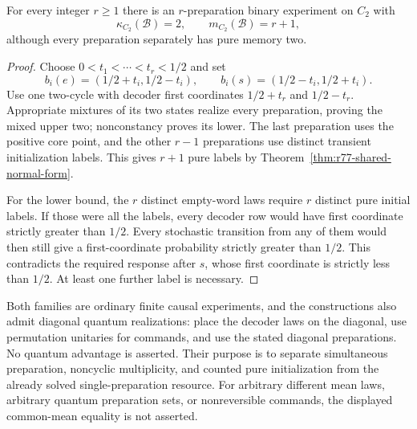 \begin{proposition}
\label{prop:r77-many-initializers}
For every integer $r\ge1$ there is an $r$-preparation binary experiment
on $C_2$ with
\[
 \kappa_{C_2}(\mathcal B)=2,
 \qquad m_{C_2}(\mathcal B)=r+1,
\]
although every preparation separately has pure memory two.
\end{proposition}
\begin{proof}
Choose $0<t_1<\cdots<t_r<1/2$ and set
\[
 b_i(e)=(1/2+t_i,1/2-t_i),\qquad
 b_i(s)=(1/2-t_i,1/2+t_i).
\]
Use one two-cycle with decoder first coordinates $1/2+t_r$ and
$1/2-t_r$.  Appropriate mixtures of its two states realize every
preparation, proving the mixed upper two; nonconstancy proves its lower.
The last preparation uses the positive core point, and the other $r-1$
preparations use distinct transient initialization labels.  This gives
$r+1$ pure labels by Theorem~\ref{thm:r77-shared-normal-form}.

For the lower bound, the $r$ distinct empty-word laws require $r$
distinct pure initial labels.  If those were all the labels, every
decoder row would have first coordinate strictly greater than $1/2$.
Every stochastic transition from any of them would then still give a
first-coordinate probability strictly greater than $1/2$.  This
contradicts the required response after $s$, whose first coordinate is
strictly less than $1/2$.  At least one further label is necessary.
\end{proof}

Both families are ordinary finite causal experiments, and the constructions
also admit diagonal quantum realizations: place the decoder laws on the
diagonal, use permutation unitaries for commands, and use the stated
diagonal preparations.  No quantum advantage is asserted.  Their purpose
is to separate simultaneous preparation, noncyclic multiplicity, and
counted pure initialization from the already solved single-preparation
resource.  For arbitrary different mean laws, arbitrary quantum preparation
sets, or nonreversible commands, the displayed common-mean equality is
not asserted.
